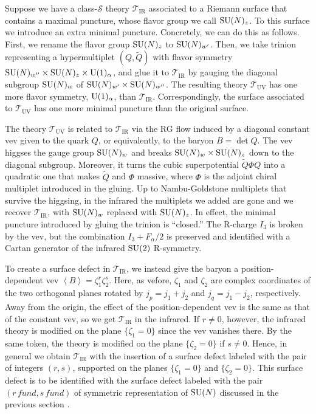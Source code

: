 Suppose we have a class-$\mathcal{S}$ theory $\mathcal{T}_{\mathrm{IR}}$
associated to a Riemann surface that contains a maximal puncture,
whose flavor group we call $\mathrm{SU}(N)_{z}$. To this surface we introduce
an extra minimal puncture. Concretely, we can do this as follows.
First, we rename the flavor group $\mathrm{SU}(N)_{z}$ to $\mathrm{SU}(N)_{w'}$. Then,
we take trinion representing a hypermultiplet $(Q,\tilde{Q})$ with
flavor symmetry $\mathrm{SU}(N)_{w''} \times \mathrm{SU}(N)_{z}\times \mathrm{U}(1)_{\alpha}$,
and glue it to $\mathcal{T}_{\mathrm{IR}}$ by gauging the diagonal
subgroup $\mathrm{SU}(N)_{w}$ of $\mathrm{SU}(N)_{w'}\times \mathrm{SU}(N)_{w''}$. The resulting
theory $\mathcal{T}_{\mathrm{UV}}$ has one more flavor symmetry,
$\mathrm{U}(1)_{\alpha}$, than $\mathcal{T}_{\mathrm{IR}}$. Correspondingly,
the surface associated to $\mathcal{T}_{\mathrm{UV}}$ has one more
minimal puncture than the original surface.

The theory $\mathcal{T}_{\mathrm{UV}}$ is related to $\mathcal{T}_{\mathrm{IR}}$
via the RG flow induced by a diagonal constant vev given to the quark
$Q$, or equivalently, to the baryon $B=\det Q$. The vev higgses
the gauge group $\mathrm{SU}(N)_{w}$ and breaks $\mathrm{SU}(N)_{w} \times \mathrm{SU}(N)_{z}$
down to the diagonal subgroup. Moreover, it turns the cubic superpotential
$\tilde{Q} \Phi Q$ into a quadratic one that makes $\tilde{Q}$ and
$\Phi$ massive, where $\Phi$ is the adjoint chiral multiplet introduced
in the gluing. Up to Nambu-Goldstone multiplets that survive the higgsing,
in the infrared the multiplets we added are gone and we recover $\mathcal{T}_{\mathrm{IR}}$,
with $\mathrm{SU}(N)_{w}$ replaced with $\mathrm{SU}(N)_{z}$. In effect, the minimal
puncture introduced by gluing the trinion is ``closed.'' The R-charge
$I_{3}$ is broken by the vev, but the combination $I_{3}+F_{\alpha}/2$
is preserved and identified with a Cartan generator of the infrared
$\mathrm{SU}(2)$ R-symmetry.

To create a surface defect in $\mathcal{T}_{\mathrm{IR}}$, we instead
give the baryon a position-dependent vev $\left\langle B\right\rangle = \zeta_{1}^{r}\zeta_{2}^{s}$.
Here, as vefore, $\zeta_{1}$ and $\zeta_{2}$ are complex coordinates
of the two orthogonal planes rotated by $j_{p}=j_{1}+j_{2}$ and $j_{q}=j_{1}-j_{2}$,
respectively. Away from the origin, the effect of the position-dependent
vev is the same as that of the constant vev, so we get $\mathcal{T}_{\mathrm{IR}}$
in the infrared. If $r\neq0$, however, the infrared theory is modified
on the plane $\{\zeta_{1}=0\}$ since the vev vanishes there. By the
same token, the theory is modified on the plane $\{\zeta_{2}=0\}$
if $s\neq0$. Hence, in general we obtain $\mathcal{T}_{\mathrm{IR}}$
with the insertion of a surface defect labeled with the pair of integers
$(r,s)$, supported on the planes $\{\zeta_{1}=0\}$ and $\{\zeta_{2}=0\}$.
This surface defect is to be identified with the surface defect labeled
with the pair $(r\,fund,s\,fund)$ of symmetric representation of
$\mathrm{SU}(N)$ discussed in the previous section \cite{Gadde:2013dda}.


